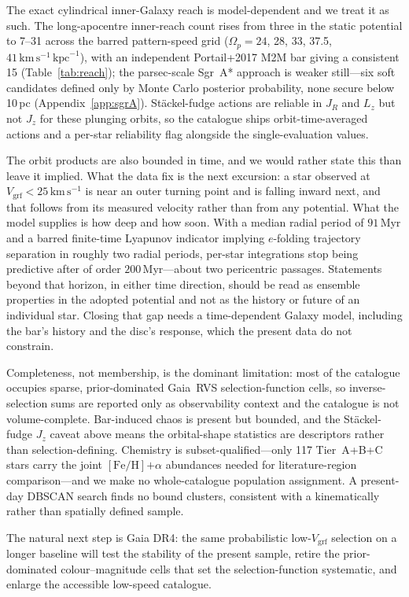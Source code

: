 \documentclass{aa}  %
\newcommand{\vgrf}{\ensuremath{V_{\mathrm{grf}}}\xspace}
\newcommand{\kms}{\ensuremath{\,\mathrm{km\,s^{-1}}}\xspace}
\newcommand{\kpc}{\ensuremath{\,\mathrm{kpc}}\xspace}
\newcommand{\FeH}{\ensuremath{[\mathrm{Fe}/\mathrm{H}]}}
\begin{document}
 The exact cylindrical inner-Galaxy reach is model-dependent and we treat it as such.
The long-apocentre inner-reach count rises from three in the static
potential to 7--31 across the barred pattern-speed grid
($\Omega_p=24$, 28, 33, 37.5, $41\kms\kpc^{-1}$), with an independent
Portail+2017 M2M bar giving a consistent 15 (Table~\ref{tab:reach}); the
parsec-scale Sgr~A* approach is weaker still---six soft candidates defined
only by Monte Carlo posterior probability, none secure below 10\,pc
(Appendix~\ref{app:sgrA}).  St\"ackel-fudge actions are reliable in $J_R$
and $L_z$ but not $J_z$ for these plunging orbits, so the catalogue ships
orbit-time-averaged actions and a per-star reliability flag alongside the
single-evaluation values.

The orbit products are also bounded in time, and we would rather state
this than leave it implied.  What the data fix is the next excursion:
a star observed at $\vgrf<25\kms$ is near an outer turning point and is
falling inward next, and that follows from its measured velocity rather
than from any potential.  What the model supplies is how deep and how
soon.  With a median radial period of $91$\,Myr and a barred finite-time
Lyapunov indicator implying $e$-folding trajectory separation in roughly
two radial periods, per-star integrations stop being predictive after of
order $200$\,Myr---about two pericentric passages.  Statements beyond
that horizon, in either time direction, should be read as ensemble
properties in the adopted potential and not as the history or future of
an individual star.  Closing that gap needs a time-dependent Galaxy
model, including the bar's history and the disc's response, which the
present data do not constrain.

Completeness, not membership, is the dominant limitation: most of the
catalogue occupies sparse, prior-dominated Gaia~RVS selection-function
cells, so inverse-selection sums are reported only as observability context
and the catalogue is not volume-complete.  Bar-induced chaos is present but
bounded, and the St\"ackel-fudge $J_z$ caveat above means the orbital-shape
statistics are descriptors rather than selection-defining.  Chemistry is
subset-qualified---only 117 Tier~A+B+C stars carry the joint
\FeH{}$+\alpha$ abundances needed for literature-region comparison---and we
make no whole-catalogue population assignment.  A present-day DBSCAN search
finds no bound clusters, consistent with a kinematically rather than
spatially defined sample.

The natural next step is Gaia DR4: the same probabilistic low-\vgrf{}
selection on a longer baseline will test the stability of the present
sample, retire the prior-dominated colour--magnitude cells that set the
selection-function systematic, and enlarge the accessible low-speed
catalogue.
\end{document}

